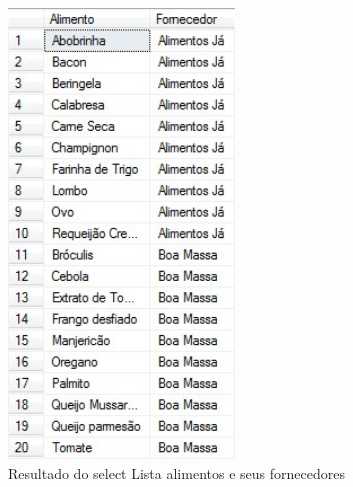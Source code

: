 \documentclass[
	12pt,				%
	openright,			%
	oneside,			%
	a4paper,			%
	chapter=TITLE,		%
	section=TITLE,		%
	english,			%
	brazil				%
	]{abntex2}
\begin{document}
    \begin{figure}[h]
         \centering
         \includegraphics[width=6cm,keepaspectratio]{Imgs/Select_001}
         \caption{Resultado do select Lista alimentos e seus fornecedores}
         \label{select01}
    \end{figure}
    
    \newpage
    \newpage
    
\end{document}
